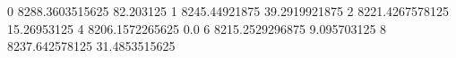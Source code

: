 0 8288.3603515625 82.203125
1 8245.44921875 39.2919921875
2 8221.4267578125 15.26953125
4 8206.1572265625 0.0
6 8215.2529296875 9.095703125
8 8237.642578125 31.4853515625
